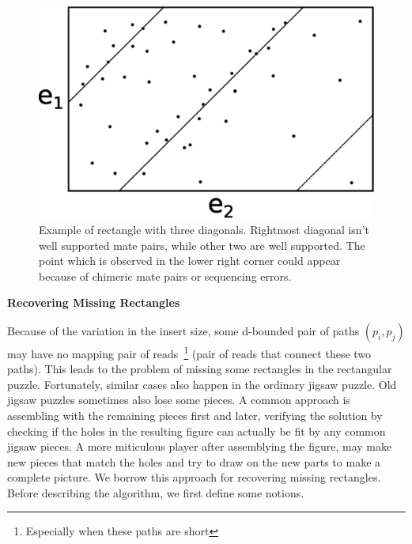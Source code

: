 \documentclass[a4paper]{article}
\begin{document}
\begin{figure}
\begin{center}
\includegraphics[scale=0.5]{fig/rectangle.eps}
\caption{Example of rectangle with three diagonals. Rightmost diagonal isn't well supported mate pairs, 
while other two are well supported. The point which is observed in the lower right corner 
could appear because of chimeric mate pairs or sequencing errors.}
\end{center}
\end{figure}

\noindent
\textbf{Recovering Missing Rectangles}

Because of the variation in the insert size, some d-bounded pair of paths $(p_i,p_j)$ may have no mapping pair 
of reads~\footnote{Especially when these paths are short} (pair of reads that connect these two paths). 
This leads to the problem of missing some rectangles in the rectangular
puzzle. Fortunately, similar cases also happen in the ordinary jigsaw puzzle.
Old jigsaw puzzles sometimes also lose some pieces. A common approach is assembling with the remaining pieces first and later, verifying  
the solution by checking if the holes in the resulting figure can actually be fit by any common jigsaw pieces. A more miticulous 
player after assemblying the figure, may make new pieces that match the holes and try to draw on the new parts to make a complete picture. 
We borrow this approach for recovering missing rectangles. Before describing the algorithm, we first define some notions.
\end{document}
